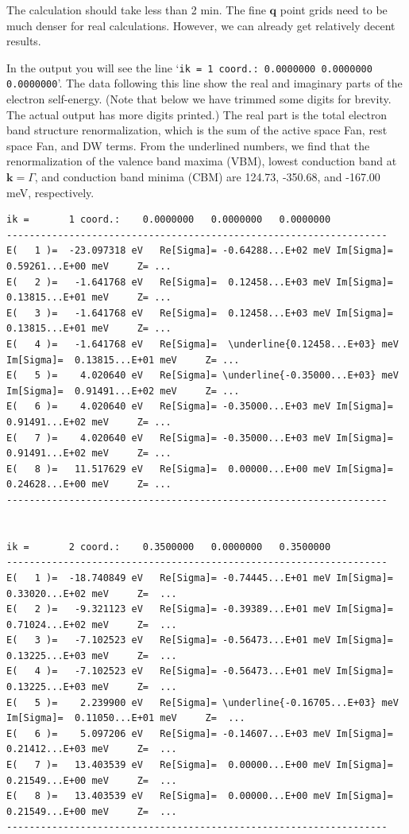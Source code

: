 \documentclass[a4paper,11pt,serif]{article}
\newcommand{\mb}[1]{\mathbf{#1}}
\begin{document}
The calculation should take less than 2 min.
The fine $\mb{q}$ point grids need to be much denser for real calculations.
However, we can already get relatively decent results.

\vspace{0.2cm}
In the output you will see the line `\texttt{ik =       1 coord.:    0.0000000   0.0000000   0.0000000}'.
The data following this line show the real and imaginary parts of the electron self-energy. (Note that below we have trimmed some digits for brevity. The actual output has more digits printed.)
The real part is the total electron band structure renormalization, which is the sum of the active space Fan, rest space Fan, and DW terms.
From the underlined numbers, we find that the renormalization of the valence band maxima (VBM), lowest conduction band at $\mb{k}=\Gamma$, and conduction band minima (CBM) are 124.73, -350.68, and -167.00 meV, respectively.
{\color{cverb}\footnotesize
\begin{Verbatim}[commandchars=\\\{\}]
ik =       1 coord.:    0.0000000   0.0000000   0.0000000
-------------------------------------------------------------------
E(   1 )=  -23.097318 eV   Re[Sigma]= -0.64288...E+02 meV Im[Sigma]=  0.59261...E+00 meV     Z= ...
E(   2 )=   -1.641768 eV   Re[Sigma]=  0.12458...E+03 meV Im[Sigma]=  0.13815...E+01 meV     Z= ...
E(   3 )=   -1.641768 eV   Re[Sigma]=  0.12458...E+03 meV Im[Sigma]=  0.13815...E+01 meV     Z= ...
E(   4 )=   -1.641768 eV   Re[Sigma]=  \underline{0.12458...E+03} meV Im[Sigma]=  0.13815...E+01 meV     Z= ...
E(   5 )=    4.020640 eV   Re[Sigma]= \underline{-0.35000...E+03} meV Im[Sigma]=  0.91491...E+02 meV     Z= ...
E(   6 )=    4.020640 eV   Re[Sigma]= -0.35000...E+03 meV Im[Sigma]=  0.91491...E+02 meV     Z= ...
E(   7 )=    4.020640 eV   Re[Sigma]= -0.35000...E+03 meV Im[Sigma]=  0.91491...E+02 meV     Z= ...
E(   8 )=   11.517629 eV   Re[Sigma]=  0.00000...E+00 meV Im[Sigma]=  0.24628...E+00 meV     Z= ...
-------------------------------------------------------------------


ik =       2 coord.:    0.3500000   0.0000000   0.3500000
-------------------------------------------------------------------
E(   1 )=  -18.740849 eV   Re[Sigma]= -0.74445...E+01 meV Im[Sigma]=  0.33020...E+02 meV     Z=  ...
E(   2 )=   -9.321123 eV   Re[Sigma]= -0.39389...E+01 meV Im[Sigma]=  0.71024...E+02 meV     Z=  ...
E(   3 )=   -7.102523 eV   Re[Sigma]= -0.56473...E+01 meV Im[Sigma]=  0.13225...E+03 meV     Z=  ...
E(   4 )=   -7.102523 eV   Re[Sigma]= -0.56473...E+01 meV Im[Sigma]=  0.13225...E+03 meV     Z=  ...
E(   5 )=    2.239900 eV   Re[Sigma]= \underline{-0.16705...E+03} meV Im[Sigma]=  0.11050...E+01 meV     Z=  ...
E(   6 )=    5.097206 eV   Re[Sigma]= -0.14607...E+03 meV Im[Sigma]=  0.21412...E+03 meV     Z=  ...
E(   7 )=   13.403539 eV   Re[Sigma]=  0.00000...E+00 meV Im[Sigma]=  0.21549...E+00 meV     Z=  ...
E(   8 )=   13.403539 eV   Re[Sigma]=  0.00000...E+00 meV Im[Sigma]=  0.21549...E+00 meV     Z=  ...
-------------------------------------------------------------------
\end{Verbatim}
}
\end{document}

